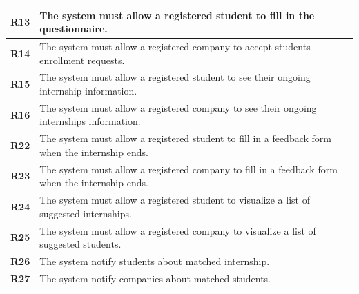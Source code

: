 \begin{table}[H]
\begin{tabular}{|l|m{10cm}|}
        \hline \textbf{R13} & The system must allow a registered student to fill in the questionnaire. \\
        \hline \textbf{R14} & The system must allow a registered company to accept students enrollment requests. \\
        \hline \textbf{R15} & The system must allow a registered student to see their ongoing internship information. \\
        \hline \textbf{R16} & The system must allow a registered company to see their ongoing internships information. \\
        \hline \textbf{R22} & The system must allow a registered student to fill in a feedback form when the internship ends. \\
        \hline \textbf{R23} & The system must allow a registered company to fill in a feedback form when the internship ends. \\
        \hline \textbf{R24} & The system must allow a registered student to visualize a list of suggested internships. \\
        \hline \textbf{R25} & The system must allow a registered company to visualize a list of suggested students. \\
        \hline \textbf{R26} & The system notify students about matched internship. \\
        \hline \textbf{R27} & The system notify companies about matched students. \\
        \hline
    \end{tabular}
\end{table}


